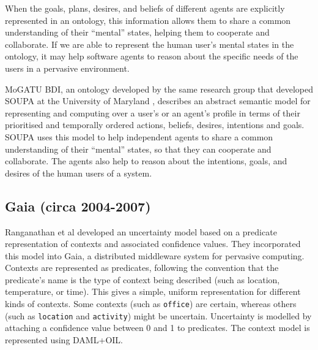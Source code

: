 







When the goals, plans, desires, and beliefs of different agents are explicitly represented in an ontology, this information allows them to share a common understanding of their ``mental'' states, helping them to cooperate and collaborate. If we are able to represent the human user's mental states in the ontology, it may help software agents to reason about the specific needs of the users in a pervasive environment. 

MoGATU \ac{BDI}, an ontology developed by the same research group that developed \ac{SOUPA} at the University of Maryland \cite{Yesha2004}, describes an abstract semantic model for representing and computing over a user's or an agent's profile in terms of their prioritised and temporally ordered actions, beliefs, desires, intentions and goals. \ac{SOUPA} uses this model to help independent agents to share a common understanding of their ``mental'' states, so that they can cooperate and collaborate. The agents also help to reason about the intentions, goals, and desires of the human users of a system. 


\subsection{Gaia (circa 2004-2007)}
Ranganathan et al \cite{Ranganathan2004} developed an uncertainty model based on a predicate representation of contexts and associated confidence values. They incorporated this model into Gaia, a distributed middleware system for pervasive computing. Contexts are represented as predicates, following the convention that the predicate's name is the type of context being described (such as location, temperature, or time). This gives a simple, uniform representation for different kinds of contexts. Some contexts (such as \texttt{office}) are certain, whereas others (such as \texttt{location} and \texttt{activity}) might be uncertain. Uncertainty is modelled by attaching a confidence value between 0 and 1 to predicates. The context model is represented using \ac{DAML}+\ac{OIL}.

